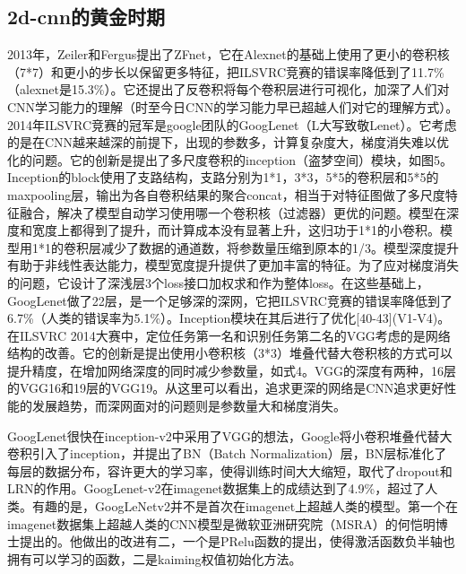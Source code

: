 \documentclass[15pt]{article}
\begin{document}
\subsection{2d-cnn的黄金时期}
2013年，Zeiler和Fergus提出了ZFnet\cite{ref39}，它在Alexnet的基础上使用了更小的卷积核（7*7）和更小的步长以保留更多特征，把ILSVRC竞赛的错误率降低到了11.7\%（alexnet是15.3\%）。它还提出了反卷积将每个卷积层进行可视化，加深了人们对CNN学习能力的理解（时至今日CNN的学习能力早已超越人们对它的理解方式）。2014年ILSVRC竞赛的冠军是google团队的GoogLenet\cite{ref40}（L大写致敬Lenet）。它考虑的是在CNN越来越深的前提下，出现的参数多，计算复杂度大，梯度消失难以优化的问题。它的创新是提出了多尺度卷积的inception（盗梦空间）模块，如图5。Inception的block使用了支路结构，支路分别为1*1，3*3，5*5的卷积层和5*5的maxpooling层，输出为各自卷积结果的聚合concat，相当于对特征图做了多尺度特征融合，解决了模型自动学习使用哪一个卷积核（过滤器）更优的问题。模型在深度和宽度上都得到了提升，而计算成本没有显著上升，这归功于1*1的小卷积。模型用1*1的卷积层减少了数据的通道数，将参数量压缩到原本的1/3。模型深度提升有助于非线性表达能力，模型宽度提升提供了更加丰富的特征。为了应对梯度消失的问题，它设计了深浅层3个loss接口加权求和作为整体loss。在这些基础上，GoogLenet做了22层，是一个足够深的深网，它把ILSVRC竞赛的错误率降低到了6.7\%（人类的错误率为5.1\%）。Inception模块在其后进行了优化[40-43](V1-V4)。在ILSVRC 2014大赛中，定位任务第一名和识别任务第二名的VGG考虑的是网络结构的改善\cite{ref44}。它的创新是提出使用小卷积核（3*3）堆叠代替大卷积核的方式可以提升精度，在增加网络深度的同时减少参数量，如式4。VGG的深度有两种，16层的VGG16和19层的VGG19。从这里可以看出，追求更深的网络是CNN追求更好性能的发展趋势，而深网面对的问题则是参数量大和梯度消失。

GoogLenet很快在inception-v2中采用了VGG的想法，Google将小卷积堆叠代替大卷积引入了inception，并提出了BN（Batch Normalization）层\cite{ref41}，BN层标准化了每层的数据分布，容许更大的学习率，使得训练时间大大缩短，取代了dropout\cite{ref45}\cite{ref46}和LRN的作用。GoogLenet-v2在imagenet数据集上的成绩达到了4.9\%，超过了人类。有趣的是，GoogLeNetv2并不是首次在imagenet上超越人类的模型。第一个在imagenet数据集上超越人类的CNN模型\cite{ref47}是微软亚洲研究院（MSRA）的何恺明博士提出的。他做出的改进有二，一个是PRelu函数的提出，使得激活函数负半轴也拥有可以学习的函数，二是kaiming权值初始化方法。
\end{document}
